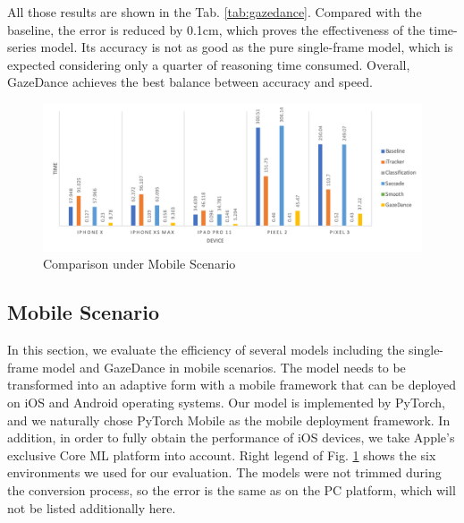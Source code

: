 \documentclass[acmlarge]{acmart}
\begin{document}
All those results are shown in the Tab. \ref{tab:gazedance}. Compared with the baseline, the error is reduced by 0.1cm, which proves the effectiveness of the time-series model. Its accuracy is not as good as the pure single-frame model, which is expected considering only a quarter of reasoning time consumed. Overall, GazeDance achieves the best balance between accuracy and speed.


\begin{figure}
  \centering
  \includegraphics[scale=0.8]{pictures/time_platforms.png}
  \caption{Comparison under Mobile Scenario}
  \label{fig:time_platforms}
\end{figure}

\subsection{Mobile Scenario}

In this section, we evaluate the efficiency of several models including the single-frame model and GazeDance in mobile scenarios. The model needs to be transformed into an adaptive form with a mobile framework that can be deployed on iOS and Android operating systems. Our model is implemented by PyTorch, and we naturally chose PyTorch Mobile as the mobile deployment framework. In addition, in order to fully obtain the performance of iOS devices, we take Apple's exclusive Core ML platform into account. Right legend of Fig. \ref{fig:time_platforms} shows the six environments we used for our evaluation. The models were not trimmed during the conversion process, so the error is the same as on the PC platform, which will not be listed additionally here. 
\end{document}
